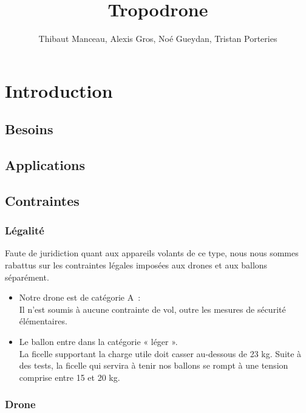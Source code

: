 \documentclass[a4paper,11pt]{article}
\title{Tropodrone}
\author{Thibaut Manceau, Alexis Gros, Noé Gueydan, Tristan Porteries}
\begin{document}
\begin{Huge}
\maketitle
\end{Huge}

\clearpage

\tableofcontents

\clearpage

\section{Introduction}

\subsection{Besoins}

\subsection{Applications}

\subsection{Contraintes}

\subsubsection{Légalité}
Faute de juridiction quant aux appareils volants de ce type, nous nous sommes rabattus sur les contraintes légales imposées aux drones et aux ballons séparément.\\
\begin{itemize}
	\item Notre drone est de catégorie A~:\\
		Il n'est soumis à aucune contrainte de vol, outre les mesures de sécurité élémentaires.
	\item Le ballon entre dans la catégorie « léger ».\\
		La ficelle supportant la charge utile doit casser au-dessous de 23 kg.
		Suite à des tests, la ficelle qui servira à tenir nos ballons se rompt à une tension comprise entre 15 et 20 kg.
\end{itemize}

\subsubsection{Drone}
\end{document}
